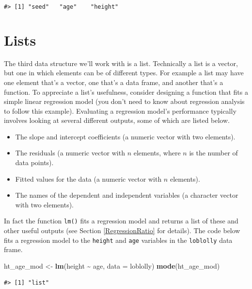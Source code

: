 \documentclass[
  11pt,
]{krantz}
\newenvironment{Shaded}{\begin{snugshade}}{\end{snugshade}}
\newcommand{\DataTypeTok}[1]{\textcolor[rgb]{0.13,0.29,0.53}{#1}}
\newcommand{\KeywordTok}[1]{\textcolor[rgb]{0.13,0.29,0.53}{\textbf{#1}}}
\newcommand{\NormalTok}[1]{#1}
\newcommand{\OperatorTok}[1]{\textcolor[rgb]{0.81,0.36,0.00}{\textbf{#1}}}
\newcommand{\StringTok}[1]{\textcolor[rgb]{0.31,0.60,0.02}{#1}}
\providecommand{\tightlist}{%
  \setlength{\itemsep}{0pt}\setlength{\parskip}{0pt}}
\theoremstyle{definition}
\theoremstyle{definition}
\theoremstyle{definition}
\theoremstyle{definition}
\theoremstyle{remark}
\begin{document}
\begin{verbatim}
#> [1] "seed"   "age"    "height"
\end{verbatim}

\hypertarget{lists}{%
\section{Lists}\label{lists}}

The third data structure we'll work with is a list. Technically a list is a vector, but one in which elements can be of different types. For example a list may have one element that's a vector, one that's a data frame, and another that's a function. To appreciate a list's usefulness, consider designing a function that fits a simple linear regression model (you don't need to know about regression analysis to follow this example). Evaluating a regression model's performance typically involves looking at several different outputs, some of which are listed below.

\begin{itemize}
\tightlist
\item
  The slope and intercept coefficients (a numeric vector with two elements).
\item
  The residuals (a numeric vector with \(n\) elements, where \(n\) is the number of data points).
\item
  Fitted values for the data (a numeric vector with \(n\) elements).
\item
  The names of the dependent and independent variables (a character vector with two elements).
\end{itemize}

In fact the function \texttt{lm()} fits a regression model and returns a list of these and other useful outputs (see Section \ref{RegressionRatio} for details). The code below fits a regression model to the \texttt{height} and \texttt{age} variables in the \texttt{loblolly} data frame.

\begin{Shaded}
\begin{Highlighting}[]
\NormalTok{ht\_age\_mod \textless{}{-}}\StringTok{ }\KeywordTok{lm}\NormalTok{(height }\OperatorTok{\textasciitilde{}}\StringTok{ }\NormalTok{age, }\DataTypeTok{data =}\NormalTok{ loblolly)}
\KeywordTok{mode}\NormalTok{(ht\_age\_mod)}
\end{Highlighting}
\end{Shaded}

\begin{verbatim}
#> [1] "list"
\end{verbatim}
\end{document}
